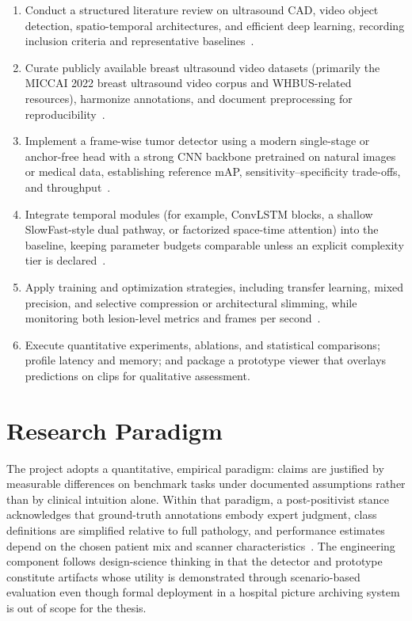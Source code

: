 \documentclass[
english,                 %
bibtex,                  %
]{kththesis}
\numberwithin{listing}{chapter}
\begin{document}
\begin{enumerate}[leftmargin=*, label=\textbf{Step \arabic*}, ref=Step \arabic*]
    \itemsep0em
    \item \label{x:s1} Conduct a structured literature review on ultrasound CAD, video object detection, spatio-temporal architectures, and efficient deep learning, recording inclusion criteria and representative baselines~\cite{dan2024_breast_us_dl_review,lin2022_buv_miccai,huang2023_3dcnn_video_review,liu2023_edgemednet}.
    \item \label{x:s2} Curate publicly available breast ultrasound video datasets (primarily the MICCAI 2022 breast ultrasound video corpus and WHBUS-related resources), harmonize annotations, and document preprocessing for reproducibility~\cite{lin2022_buv_miccai,zhang2024_whbus_isbi}.
    \item \label{x:s3} Implement a frame-wise tumor detector using a modern single-stage or anchor-free head with a strong CNN backbone pretrained on natural images or medical data, establishing reference mAP, sensitivity--specificity trade-offs, and throughput~\cite{redmon2018_yolov3,lin2017_focal_loss_retinanet,lin2022_buv_miccai}.
    \item \label{x:s4} Integrate temporal modules (for example, ConvLSTM blocks, a shallow SlowFast-style dual pathway, or factorized space-time attention) into the baseline, keeping parameter budgets comparable unless an explicit complexity tier is declared~\cite{shi2015_convlstm,feichtenhofer2019_slowfast,bertasius2021_spacetime_attention}.
    \item \label{x:s5} Apply training and optimization strategies, including transfer learning, mixed precision, and selective compression or architectural slimming, while monitoring both lesion-level metrics and frames per second~\cite{liu2023_edgemednet}.
    \item \label{x:s6} Execute quantitative experiments, ablations, and statistical comparisons; profile latency and memory; and package a prototype viewer that overlays predictions on clips for qualitative assessment.
\end{enumerate}


\section{Research Paradigm}
\label{sec:researchParadigm}

The project adopts a quantitative, empirical paradigm: claims are justified by measurable differences on benchmark tasks under documented assumptions rather than by clinical intuition alone.
Within that paradigm, a post-positivist stance acknowledges that ground-truth annotations embody expert judgment, class definitions are simplified relative to full pathology, and performance estimates depend on the chosen patient mix and scanner characteristics~\cite{dan2024_breast_us_dl_review}.
The engineering component follows design-science thinking in that the detector and prototype constitute artifacts whose utility is demonstrated through scenario-based evaluation even though formal deployment in a hospital picture archiving system is out of scope for the thesis.
\end{document}
